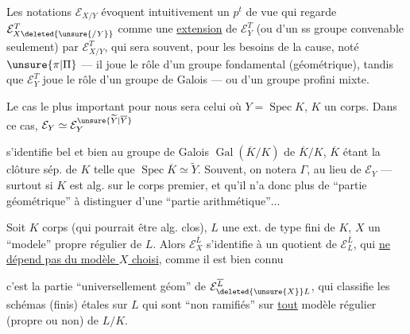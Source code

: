 Les notations  $\mathcal E_{X/Y}$ évoquent
intuitivement un $p^t$ de vue qui
regarde $\mathcal E_{X\deleted{\unsure{/Y}}}^T$ comme une \uline{extension}
de $\mathcal E_Y^T$ (ou d'un ss groupe
convenable seulement) par $\mathcal E_{X/Y}^T$,
qui sera souvent, pour les besoins de
la cause, noté $\unsure{\pi|\Pi}$ --- il joue le
rôle d'un groupe fondamental
(géométrique), tandis que $\mathcal E_Y^T$ joue
le rôle d'un groupe de Galois ---
ou d'un groupe profini mixte.


Le cas le plus important pour nous
sera celui où $Y=\operatorname{Spec}K$, $K$ un corps.
 Dans ce cas, $\mathcal E_Y\simeq\mathcal E_Y^{\unsure{\widetilde Y|\overline Y}}$



s'identifie bel et bien au groupe
de Galois $\operatorname{Gal}(\overline K/K)$ de  $\overline K/K$,
$\overline K$ étant la clôture sép. de $K$ telle que
$\operatorname{Spec}\overline K\simeq\widetilde Y$. Souvent, on notera
$\Gamma$,  au lieu de $\mathcal E_Y$ --- surtout
si $K$ est alg. sur le corps premier,
et qu'il n'a donc plus de ``partie
géométrique'' à distinguer d'une
``partie arithmétique''$\ldots$

Soit  $K$  corps (qui pourrait
être alg. clos), $L$ une ext. de
type fini de $K$, $X$ un ``modele''
propre régulier de $L$. Alors
$\mathcal E_X^{\overline L}$ s'identifie à un quotient de $\mathcal E_L^{\overline L}$,
qui \uline{ne  dépend pas du modèle
$X$ choisi}, comme il est bien connu



c'est la partie ``universellement géom'' de $\mathcal E_{\deleted{\unsure{X}}L}^{\overline L}$,    qui classifie les schémas (finis) étales sur $L$ qui sont ``non ramifiés'' sur \uline{tout} modèle  régulier (propre ou non) de $L/K$.

